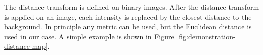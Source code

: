 \documentclass[
  digital,     %
  oneside,     %
  nosansbold,  %
  nocolorbold, %
  lof,         %
  lot,         %
]{fithesis4}
\begin{document}
The distance transform is defined on binary images. After the distance transform
is applied on an image, each intensity is replaced by the closest distance to
the background. In principle any metric can be used, but the Euclidean distance
is used in our case. A simple example is shown in Figure
\ref{fig:demonstration-distance-map}.

\begin{figure}
    \begin{subfigure}[t]{0.48\textwidth}
    \end{subfigure}
    \begin{subfigure}[t]{0.48\textwidth}

\end{subfigure}
\end{figure}
\end{document}
